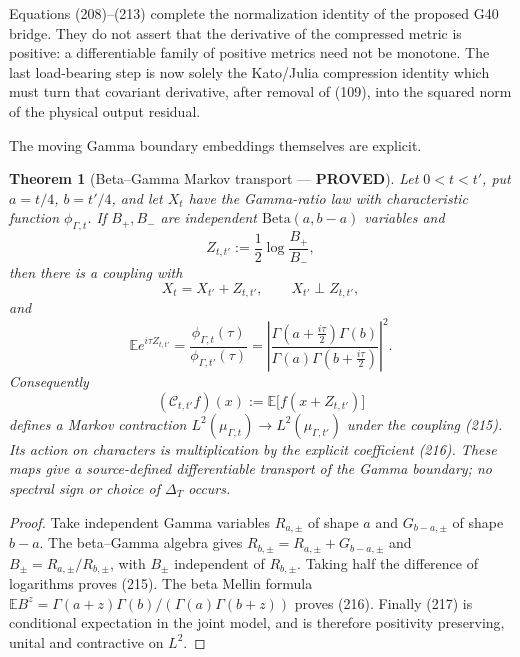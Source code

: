 \documentclass[11pt]{article}
\newtheorem{theorem}{Theorem}
\newcommand{\PROVED}{\textcolor{green!45!black}{\textbf{PROVED}}}
\begin{document}
Equations (208)--(213) complete the normalization identity of the proposed
G40 bridge.  They do not assert that the derivative of the compressed metric
is positive: a differentiable family of positive metrics need not be
monotone.  The last load-bearing step is now solely the Kato/Julia compression
identity which must turn that covariant derivative, after removal of (109),
into the squared norm of the physical output residual.

The moving Gamma boundary embeddings themselves are explicit.

\begin{theorem}[Beta--Gamma Markov transport --- \PROVED]
Let $0<t<t'$, put $a=t/4$, $b=t'/4$, and let $X_t$ have the Gamma-ratio law
with characteristic function $\phi_{\Gamma,t}$.  If $B_+,B_-$ are independent
$\mathrm{Beta}(a,b-a)$ variables and
\begin{equation}
 Z_{t,t'}:=\frac12\log\frac{B_+}{B_-},                \tag{214}
\end{equation}
then there is a coupling with
\begin{equation}
 X_t=X_{t'}+Z_{t,t'},\qquad X_{t'}\perp Z_{t,t'},     \tag{215}
\end{equation}
and
\begin{equation}
 \mathbb E e^{i\tau Z_{t,t'}}
 =\frac{\phi_{\Gamma,t}(\tau)}{\phi_{\Gamma,t'}(\tau)}
 =\left|
 \frac{\Gamma(a+\frac{i\tau}{2})\Gamma(b)}
      {\Gamma(a)\Gamma(b+\frac{i\tau}{2})}
 \right|^2.                                          \tag{216}
\end{equation}
Consequently
\begin{equation}
 (\mathcal C_{t,t'}f)(x)
 :=\mathbb E\bigl[f(x+Z_{t,t'})\bigr]                \tag{217}
\end{equation}
defines a Markov contraction
$L^2(\mu_{\Gamma,t})\to L^2(\mu_{\Gamma,t'})$ under the coupling (215).
Its action on characters is multiplication by the explicit coefficient
(216).  These maps give a source-defined differentiable transport of the
Gamma boundary; no spectral sign or choice of $\Delta_T$ occurs.
\end{theorem}

\begin{proof}
Take independent Gamma variables $R_{a,\pm}$ of shape $a$ and
$G_{b-a,\pm}$ of shape $b-a$.  The beta--Gamma algebra gives
$R_{b,\pm}=R_{a,\pm}+G_{b-a,\pm}$ and
$B_\pm=R_{a,\pm}/R_{b,\pm}$, with $B_\pm$ independent of
$R_{b,\pm}$.  Taking half the difference of logarithms proves (215).
The beta Mellin formula
$\mathbb EB^z=\Gamma(a+z)\Gamma(b)/(\Gamma(a)\Gamma(b+z))$
proves (216).  Finally (217) is conditional expectation in the joint model,
and is therefore positivity preserving, unital and contractive on $L^2$.
\end{proof}
\end{document}
